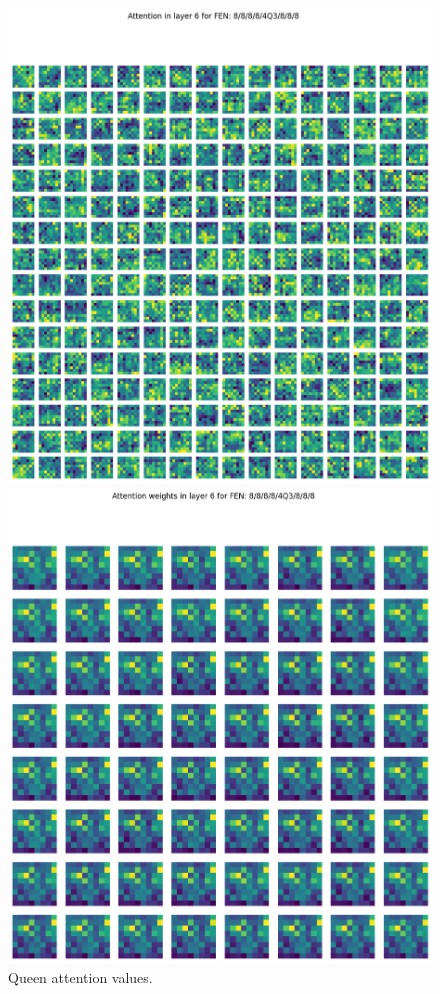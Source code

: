 \begin{figure}[H]
  \begin{minipage}{0.475\textwidth}
    \centering
    \includegraphics[width=\textwidth]{project/img/attention_maps/Q_attention_6.png}
    \caption{Queen attention values.}
    \label{atnQ}
  \end{minipage}
  \hspace{0.05\textwidth}
  \begin{minipage}{0.475\textwidth}
    \centering
    \includegraphics[width=\textwidth]{project/img/attention_maps/Q_weights_6.png}

\end{minipage}
\end{figure}
